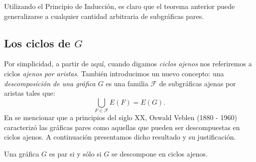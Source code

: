 Utilizando el Principio de Inducción, es claro que el teorema anterior puede generalizarse a cualquier cantidad arbitraria de subgráficas pares.

\subsection{Los ciclos de $G$}
Por simplicidad, a partir de aquí, cuando digamos \textit{ciclos ajenos} nos referiremos a ciclos \textit{ajenos por aristas}. También introducimos un nuevo concepto: una \textit{descomposición de una gráfica $G$}  es una familia $\mathcal{F}$ de subgráficas ajenas por aristas tales que:
$$
\bigcup_{F \in \mathcal{F}} E(F) = E(G).
$$
En \cite{Bondy,Seshu,Deo, Biggs} se mencionar que a principios del siglo XX, Oswald Veblen (1880 - 1960) caracterizó las gráficas pares como aquellas que pueden ser descompuestas en ciclos ajenos. A continuación presentamos dicho resultado y su justificación.

\begin{teo} \label{teo:veblen}
Una gráfica $G$ es par si y sólo si $G$ se descompone en ciclos ajenos.
\end{teo}

